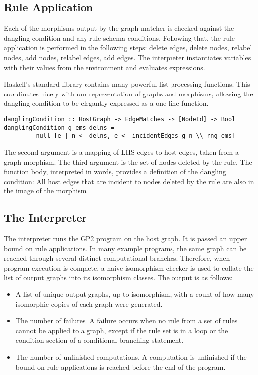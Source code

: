 \subsection{Rule Application}
Each of the morphisms output by the graph matcher is checked against the dangling condition and any rule schema conditions. Following that, the rule application is performed in the following steps: delete edges, delete nodes, relabel nodes, add nodes, relabel edges, add edges. The interpreter instantiates variables with their values from the environment and evaluates expressions.

Haskell's standard library contains many powerful list processing functions. This coordinates nicely with our representation of graphs and morphisms, allowing the dangling condition to be elegantly expressed as a one line function.
\begin{verbatim}
danglingCondition :: HostGraph -> EdgeMatches -> [NodeId] -> Bool
danglingCondition g ems delns = 
         null [e | n <- delns, e <- incidentEdges g n \\ rng ems]
\end{verbatim}

The second argument is a mapping of LHS-edges to host-edges, taken from a graph morphism. The third argument is the set of nodes deleted by the rule. The function body, interpreted in words, provides a definition of the dangling condition: All host edges that are incident to nodes deleted by the rule are also in the image of the morphism. 

\subsection{The Interpreter}

The interpreter runs the GP2 program on the host graph. It is passed an upper bound on rule applications. In many example programs, the same graph can be reached through several distinct computational branches. Therefore, when program execution is complete, a naive isomorphism checker is used to collate the list of output graphs into its isomorphism classes. The output is as follows:

\begin{itemize}
\item A list of unique output graphs, up to isomorphism, with a count of how many isomorphic copies of each graph were generated.
\item The number of failures. A failure occurs when no rule from a set of rules cannot be applied to a graph, except if the rule set is in a loop or the condition section of a conditional branching statement.
\item The number of unfinished computations. A computation is unfinished if the bound on rule applications is reached before the end of the program.
\end{itemize}

